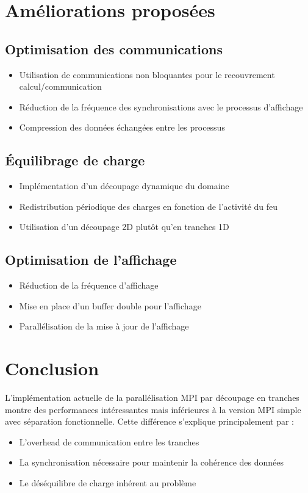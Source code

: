 \documentclass[11pt]{article}
\begin{document}
\section{Améliorations proposées}

\subsection{Optimisation des communications}
\begin{itemize}
    \item Utilisation de communications non bloquantes pour le recouvrement calcul/communication
    \item Réduction de la fréquence des synchronisations avec le processus d'affichage
    \item Compression des données échangées entre les processus
\end{itemize}

\subsection{Équilibrage de charge}
\begin{itemize}
    \item Implémentation d'un découpage dynamique du domaine
    \item Redistribution périodique des charges en fonction de l'activité du feu
    \item Utilisation d'un découpage 2D plutôt qu'en tranches 1D
\end{itemize}

\subsection{Optimisation de l'affichage}
\begin{itemize}
    \item Réduction de la fréquence d'affichage
    \item Mise en place d'un buffer double pour l'affichage
    \item Parallélisation de la mise à jour de l'affichage
\end{itemize}

\section{Conclusion}
L'implémentation actuelle de la parallélisation MPI par découpage en tranches montre des performances intéressantes mais inférieures à la version MPI simple avec séparation fonctionnelle. Cette différence s'explique principalement par :
\begin{itemize}
    \item L'overhead de communication entre les tranches
    \item La synchronisation nécessaire pour maintenir la cohérence des données
    \item Le déséquilibre de charge inhérent au problème
\end{itemize}
\end{document}
